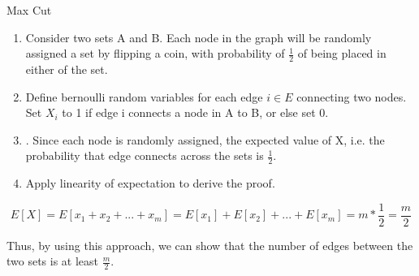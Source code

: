 \begin{algorithm}
\caption{Max Cut}
\begin{algorithmic}
\begin{enumerate}
    \item Consider two sets A and B. Each node in the graph will be randomly assigned a set by flipping a coin, with probability of \(\frac{1}{2} \) of being placed in either of the set.
    \item Define bernoulli random variables for each edge \(i \in E\) connecting two nodes. Set \(X_i\) to 1 if edge i connects a node in A to B, or else set 0.
    \item. Since each node is randomly assigned, the expected value of X, i.e. the probability that edge connects across the sets is \(\frac{1}{2}\).
    \item Apply linearity of expectation to derive the proof.

\end{enumerate}   
\end{algorithmic}
\end{algorithm}

\[
E[X] = E[x_1+x_2+...+x_m ] = E[x_1]+E[x_2]+...+E[x_m] = m*\frac{1}{2} = \frac{m}{2}
\]

Thus, by using this approach, we can show that the number of edges between the two sets is at least \(\frac{m}{2}\).
